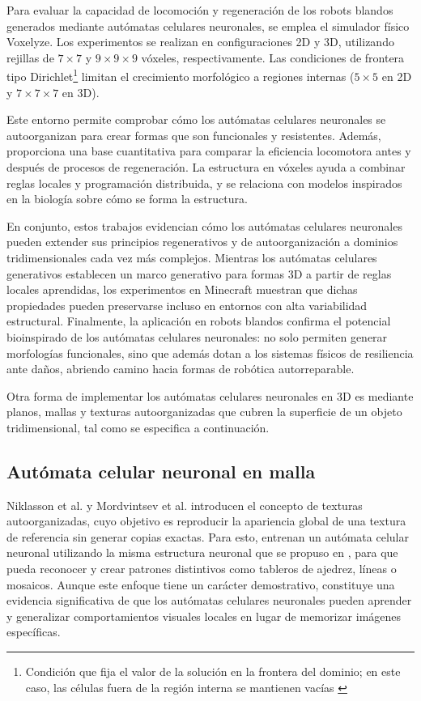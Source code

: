 Para evaluar la capacidad de locomoción y regeneración de los robots blandos generados mediante autómatas celulares neuronales, se emplea el simulador físico Voxelyze. Los experimentos se realizan en configuraciones 2D y 3D, utilizando rejillas de $7 \times 7$ y $9 \times 9 \times 9$ vóxeles, respectivamente. Las condiciones de frontera tipo Dirichlet\footnote{Condición que fija el valor de la solución en la frontera del dominio; en este caso, las células fuera de la región interna se mantienen vacías \cite{leveque2007_fdm}} limitan el crecimiento morfológico a regiones internas ($5 \times 5$ en 2D y $7 \times 7 \times 7$ en 3D).

Este entorno permite comprobar cómo los autómatas celulares neuronales se autoorganizan para crear formas que son funcionales y resistentes. Además, proporciona una base cuantitativa para comparar la eficiencia locomotora antes y después de procesos de regeneración. La estructura en vóxeles ayuda a combinar reglas locales y programación distribuida, y se relaciona con modelos inspirados en la biología sobre cómo se forma la estructura.

En conjunto, estos trabajos evidencian cómo los autómatas celulares neuronales pueden extender sus principios regenerativos y de autoorganización a dominios tridimensionales cada vez más complejos. Mientras los autómatas celulares generativos establecen un marco generativo para formas 3D a partir de reglas locales aprendidas, los experimentos en Minecraft muestran que dichas propiedades pueden preservarse incluso en entornos con alta variabilidad estructural. Finalmente, la aplicación en robots blandos confirma el potencial bioinspirado de los autómatas celulares neuronales: no solo permiten generar morfologías funcionales, sino que además dotan a los sistemas físicos de resiliencia ante daños, abriendo camino hacia formas de robótica autorreparable.

Otra forma de implementar los autómatas celulares neuronales en 3D es mediante planos, mallas y texturas autoorganizadas que cubren la superficie de un objeto tridimensional, tal como se especifica a continuación.

\subsection{Autómata celular neuronal en malla}

Niklasson et al. \cite{mordvintsev2021_mnca} y Mordvintsev et al. \cite{mordvintsev2021_mnca2} \cite{mordvintsev2021_unca} introducen el concepto de texturas autoorganizadas, cuyo objetivo es reproducir la apariencia global de una textura de referencia sin generar copias exactas. Para esto, entrenan un autómata celular neuronal utilizando la misma estructura neuronal que se propuso en \cite{mordvintsev2020_nca}, para que pueda reconocer y crear patrones distintivos como tableros de ajedrez, líneas o mosaicos. Aunque este enfoque tiene un carácter demostrativo, constituye una evidencia significativa de que los autómatas celulares neuronales pueden aprender y generalizar comportamientos visuales locales en lugar de memorizar imágenes específicas.

